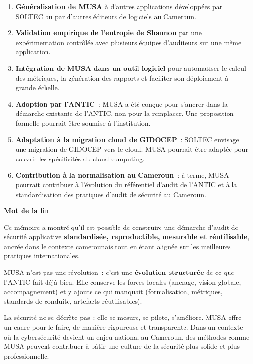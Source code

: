 \documentclass[12pt,a4paper,oneside]{report}
\begin{document}
\begin{enumerate}[label={\color{gold}\theenumi.}, leftmargin=*]
	\item \textbf{Généralisation de MUSA} à d'autres applications
	développées par SOLTEC ou par d'autres éditeurs de logiciels
	au Cameroun.
	
	\item \textbf{Validation empirique de l'entropie de Shannon} par
	une expérimentation contrôlée avec plusieurs équipes d'auditeurs
	sur une même application.
	
	\item \textbf{Intégration de MUSA dans un outil logiciel} pour
	automatiser le calcul des métriques, la génération des rapports
	et faciliter son déploiement à grande échelle.
	
	\item \textbf{Adoption par l'ANTIC}~: MUSA a été conçue pour s'ancrer
	dans la démarche existante de l'ANTIC, non pour la remplacer.
	Une proposition formelle pourrait être soumise à l'institution.
	
	\item \textbf{Adaptation à la migration cloud de GIDOCEP}~: SOLTEC
	envisage une migration de GIDOCEP vers le cloud. MUSA pourrait
	être adaptée pour couvrir les spécificités du cloud computing.
	
	\item \textbf{Contribution à la normalisation au Cameroun}~: à terme,
	MUSA pourrait contribuer à l'évolution du référentiel d'audit de
	l'ANTIC et à la standardisation des pratiques d'audit de sécurité
	au Cameroun.
\end{enumerate}

\medskip

\noindent\textbf{Mot de la fin}

Ce mémoire a montré qu'il est possible de construire une démarche
d'audit de sécurité applicative \textbf{standardisée, reproductible,
	mesurable et réutilisable}, ancrée dans le contexte camerounais tout
en étant alignée sur les meilleures pratiques internationales.

MUSA n'est pas une révolution~: c'est une \textbf{évolution structurée}
de ce que l'ANTIC fait déjà bien. Elle conserve les forces locales
(ancrage, vision globale, accompagnement) et y ajoute ce qui manquait
(formalisation, métriques, standards de conduite, artefacts réutilisables).

La sécurité ne se décrète pas~: elle se mesure, se pilote, s'améliore.
MUSA offre un cadre pour le faire, de manière rigoureuse et transparente.
Dans un contexte où la cybersécurité devient un enjeu national au
Cameroun, des méthodes comme MUSA peuvent contribuer à bâtir une
culture de la sécurité plus solide et plus professionnelle.
\end{document}
